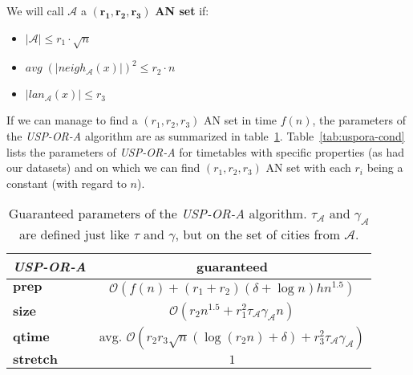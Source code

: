 \documentclass{svk_long_en}
\begin{document}
		We will call $\mathcal{A}$ a $\bm{(r_{1}, r_{2}, r_{3})}$ \textbf{AN set} if:
		\begin{itemize}
			\item $|\mathcal{A}| \leq r_{1} \cdot \sqrt{n}$
			\item $avg \; (|neigh_{\mathcal{A}}(x)|)^{2} \leq r_{2} \cdot n$
			\item $|lan_{\mathcal{A}}(x)| \leq r_{3}$
		\end{itemize}
		\hspace{\fill}
		
		If we can manage to find a $(r_{1}, r_{2}, r_{3})$ AN set in time $f(n)$, the parameters of the \textit{USP-OR-A} algorithm are as summarized in table~\ref{tab:uspora-guar}. Table~\ref{tab:uspora-cond} lists the parameters of \textit{USP-OR-A} for timetables with specific properties (as had our datasets) and on which we can find $(r_{1}, r_{2}, r_{3})$ AN set with each $r_{i}$ being a constant (with regard to $n$).
		
		\begin{table}[h!]
			\centering
			\footnotesize
			\begin{tabular}{l|c}
				\cellcolor{oracle-clr} \textit{\textbf{USP-OR-A}} & 
				\cellcolor{oracle-clr} \textbf{guaranteed} \\
				\hline
				\cellcolor{oracle-clr} $\bm{prep}$ & $\mathcal{O}(f(n) + (r_{1} + r_{2}) (\delta + \log n) h n^{1.5})$ \\
				\cellcolor{oracle-clr} $\bm{size}$ & $\mathcal{O}(r_{2} n^{1.5} + r_{1}^{2} \tau_{\mathcal{A}} \gamma_{\mathcal{A}} n)$ \\
				\cellcolor{oracle-clr} $\bm{qtime}$ & avg. $\mathcal{O}(r_{2} r_{3} \sqrt{n} (\log (r_{2}n) + \delta) + r_{3}^{2} \tau_{\mathcal{A}} \gamma_{\mathcal{A}})$ \\
				\cellcolor{oracle-clr} $\bm{stretch}$ & $1$ \\
			\end{tabular}
			\caption{\label{tab:uspora-guar} Guaranteed parameters of the \textit{USP-OR-A} algorithm. $\tau_{\mathcal{A}}$ and $\gamma_{\mathcal{A}}$ are defined just like $\tau$ and $\gamma$, but on the set of cities from $\mathcal{A}$.}
		\end{table}
		
\end{document}

